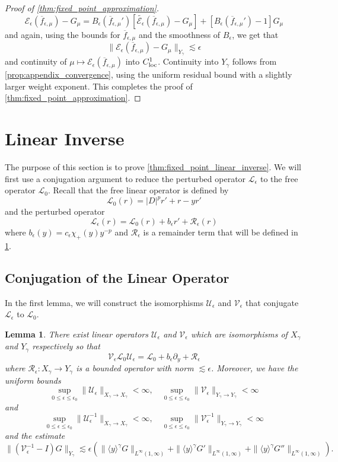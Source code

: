 \documentclass[11pt]{amsart}
\newtheorem{lemma}[theorem]{Lemma}
\theoremstyle{definition}
\theoremstyle{remark}
\numberwithin{equation}{section}
\newcommand{\sq}[1]{\widetilde{#1}}
\newcommand{\mc}[1]{\mathcal{#1}}
\newcommand{\ov}[1]{\overline{#1}}
\newcommand{\ang}[1]{\langle #1 \rangle}
\begin{document}
\begin{proof}[Proof of \cref{thm:fixed_point_approximation}]
    \[\mc{E}_\epsilon(\ov{f}_{\epsilon, \mu}) - G_\mu = B_\epsilon(\ov{f}_{\epsilon, \mu}')[\sq{\mc{E}_\epsilon}(\ov{f}_{\epsilon, \mu}) - G_\mu] + [B_\epsilon(\ov{f}_{\epsilon, \mu}') - 1]G_\mu\]
    and again, using the bounds for $\ov{f}_{\epsilon, \mu}$ and the smoothness of $B_\epsilon$, we get that
    \[\|\mc{E}_\epsilon(\ov{f}_{\epsilon, \mu}) - G_\mu\|_{Y_\gamma} \lesssim \epsilon\]
    and continuity of $\mu \mapsto \mc{E}_\epsilon(\ov{f}_{\epsilon, \mu})$ into $C_{\textup{loc}}^1$. Continuity into $Y_\gamma$ follows from \cref{prop:appendix_convergence}, using the uniform residual bound with a slightly larger weight exponent. This completes the proof of \cref{thm:fixed_point_approximation}.
\end{proof}

\section{Linear Inverse}\label{sec:linear_inverse}

The purpose of this section is to prove \cref{thm:fixed_point_linear_inverse}. We will first use a conjugation argument to reduce the perturbed operator $\mc{L}_\epsilon$ to the free operator $\mc{L}_0$. Recall that the free linear operator is defined by
\[\mc{L}_0(r) = |D|^pr' + r - yr'\]
and the perturbed operator 
\[\mc{L}_\epsilon(r) = \mc{L}_0(r) + b_\epsilon r' + \mc{R}_\epsilon(r)\]
where $b_\epsilon(y) = c_\epsilon \chi_+(y)y^{-p}$ and $\mc{R}_\epsilon$ is a remainder term that will be defined in \cref{lem:linear_conjugation}. 

\subsection{Conjugation of the Linear Operator}

In the first lemma, we will construct the isomorphisms $\mc{U}_\epsilon$ and $\mc{V}_\epsilon$ that conjugate $\mc{L}_\epsilon$ to $\mc{L}_0$.

\begin{lemma}\label{lem:linear_conjugation}
    There exist linear operators $\mc{U}_\epsilon$ and $\mc{V}_\epsilon$ which are isomorphisms of $X_\gamma$ and $Y_\gamma$ respectively so that 
    \[\mc{V}_\epsilon \mc{L}_0 \mc{U}_\epsilon  = \mc{L}_0 + b_\epsilon \partial_y + \mc{R}_\epsilon\]
    where $\mc{R}_\epsilon: X_\gamma \to Y_\gamma$ is a bounded operator with norm $\lesssim \epsilon$. Moreover, we have the uniform bounds
    \[\sup_{0 \leq \epsilon \leq \epsilon_0}\|\mc{U}_{\epsilon}\|_{X_\gamma \to X_\gamma} < \infty, \quad \sup_{0 \leq \epsilon \leq \epsilon_0}\|\mc{V}_{\epsilon}\|_{Y_\gamma \to Y_\gamma} < \infty\]
    and
    \[\sup_{0 \leq \epsilon \leq \epsilon_0}\|\mc{U}_{\epsilon}^{-1}\|_{X_\gamma \to X_\gamma} < \infty, \quad \sup_{0 \leq \epsilon \leq \epsilon_0}\|\mc{V}_{\epsilon}^{-1}\|_{Y_\gamma \to Y_\gamma} < \infty\]
    and the estimate
    \[\|(\mc{V}_\epsilon^{-1} - I)G\|_{Y_\gamma} \lesssim \epsilon(\|\ang{y}^{\gamma}G\|_{L^\infty(1, \infty)} + \|\ang{y}^{\gamma}G'\|_{L^\infty(1, \infty)} + \|\ang{y}^{\gamma}G''\|_{L^\infty(1, \infty)}).\]
\end{lemma}
\end{document}
